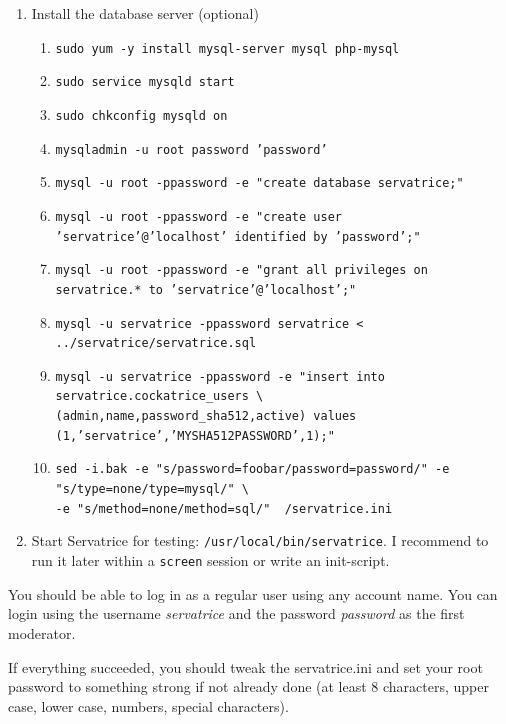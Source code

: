 \documentclass[a4paper]{scrbook}
\newcommand{\shellcmd}[1]{\texttt{\scriptsize #1}}
\begin{document}
\begin{enumerate}
\begin{framed}
\begin{verbatim}
[game]
max_game_inactivity_time=120
max_player_inactivity_time=15

[security]
max_users_per_address=8
message_counting_interval=10
max_message_size_per_interval=1000
max_message_count_per_interval=10
max_games_per_user=5
\end{verbatim}
\end{framed}

 \item Install the database server (optional)
\begin{enumerate}
 \item \shellcmd{sudo yum -y install mysql-server mysql php-mysql}
 \item \shellcmd{sudo service mysqld start}
 \item \shellcmd{sudo chkconfig mysqld on}
 \item \shellcmd{mysqladmin -u root password 'password'}
 \item \shellcmd{mysql -u root -ppassword -e "create database servatrice;"}
 \item \shellcmd{mysql -u root -ppassword -e "create user 'servatrice'@'localhost' identified by 'password';"}
 \item \shellcmd{mysql -u root -ppassword -e "grant all privileges on servatrice.* to 'servatrice'@'localhost';"}
 \item \shellcmd{mysql -u servatrice -ppassword servatrice < ../servatrice/servatrice.sql}
 \item \shellcmd{mysql -u servatrice -ppassword -e "insert into servatrice.cockatrice\_users \textbackslash\\ (admin,name,password\_sha512,active) values (1,'servatrice','MYSHA512PASSWORD',1);"}
 \item \shellcmd{sed -i.bak -e "s/password=foobar/password=password/" -e "s/type=none/type=mysql/" \textbackslash\\ -e "s/method=none/method=sql/" ~/servatrice.ini}
\end{enumerate}

 \item Start Servatrice for testing: \shellcmd{/usr/local/bin/servatrice}. I recommend to run it later within a \shellcmd{screen} session or write an init-script.
\end{enumerate}
You should be able to log in as a regular user using any account name.
You can login using the username \textit{servatrice} and the password \textit{password} as the first moderator.

If everything succeeded, you should tweak the servatrice.ini and set your root password to something strong if not already done (at least 8 characters, upper case, lower case, numbers, special characters).

\end{document}
